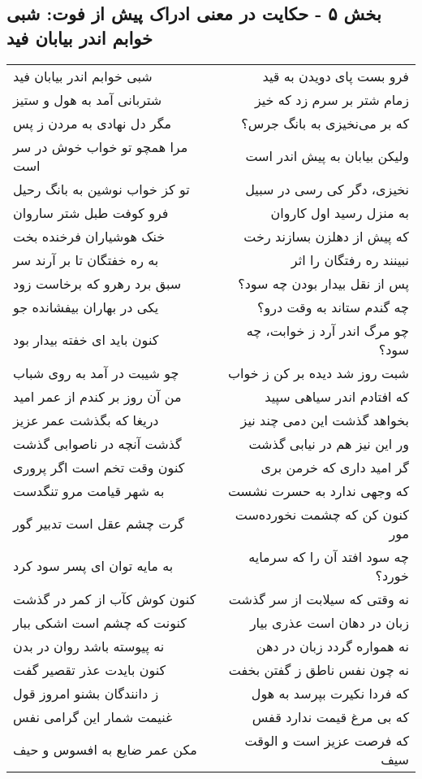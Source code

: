 \begin{center}
\section*{بخش ۵ - حکایت در معنی ادراک پیش از فوت: شبی خوابم اندر بیابان فید}
\label{sec:005}
\begin{longtable}{l p{0.5cm} r}
شبی خوابم اندر بیابان فید
&&
فرو بست پای دویدن به قید
\\
شتربانی آمد به هول و ستیز
&&
زمام شتر بر سرم زد که خیز
\\
مگر دل نهادی به مردن ز پس
&&
که بر می‌نخیزی به بانگ جرس؟
\\
مرا همچو تو خواب خوش در سر است
&&
ولیکن بیابان به پیش اندر است
\\
تو کز خواب نوشین به بانگ رحیل
&&
نخیزی، دگر کی رسی در سبیل
\\
فرو کوفت طبل شتر ساروان
&&
به منزل رسید اول کاروان
\\
خنک هوشیاران فرخنده بخت
&&
که پیش از دهلزن بسازند رخت
\\
به ره خفتگان تا بر آرند سر
&&
نبینند ره رفتگان را اثر
\\
سبق برد رهرو که برخاست زود
&&
پس از نقل بیدار بودن چه سود؟
\\
یکی در بهاران بیفشانده جو
&&
چه گندم ستاند به وقت درو؟
\\
کنون باید ای خفته بیدار بود
&&
چو مرگ اندر آرد ز خوابت، چه سود؟
\\
چو شیبت در آمد به روی شباب
&&
شبت روز شد دیده بر کن ز خواب
\\
من آن روز بر کندم از عمر امید
&&
که افتادم اندر سیاهی سپید
\\
دریغا که بگذشت عمر عزیز
&&
بخواهد گذشت این دمی چند نیز
\\
گذشت آنچه در ناصوابی گذشت
&&
ور این نیز هم در نیابی گذشت
\\
کنون وقت تخم است اگر پروری
&&
گر امید داری که خرمن بری
\\
به شهر قیامت مرو تنگدست
&&
که وجهی ندارد به حسرت نشست
\\
گرت چشم عقل است تدبیر گور
&&
کنون کن که چشمت نخورده‌ست مور
\\
به مایه توان ای پسر سود کرد
&&
چه سود افتد آن را که سرمایه خورد؟
\\
کنون کوش کآب از کمر در گذشت
&&
نه وقتی که سیلابت از سر گذشت
\\
کنونت که چشم است اشکی ببار
&&
زبان در دهان است عذری بیار
\\
نه پیوسته باشد روان در بدن
&&
نه همواره گردد زبان در دهن
\\
کنون بایدت عذر تقصیر گفت
&&
نه چون نفس ناطق ز گفتن بخفت
\\
ز دانندگان بشنو امروز قول
&&
که فردا نکیرت بپرسد به هول
\\
غنیمت شمار این گرامی نفس
&&
که بی مرغ قیمت ندارد قفس
\\
مکن عمر ضایع به افسوس و حیف
&&
که فرصت عزیز است و الوقت سیف
\\
\end{longtable}
\end{center}
